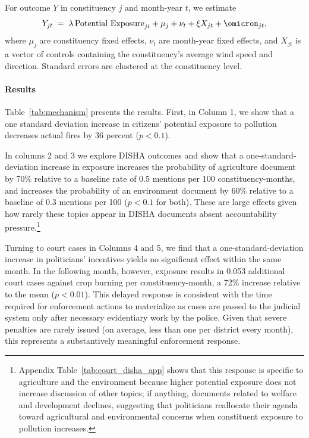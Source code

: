 \documentclass[12pt]{article}
\begin{document}
For outcome $Y$ in constituency $j$ and month-year $t$, we estimate
\begin{equation}
Y_{jt} \;=\; \lambda \, \text{Potential Exposure}_{jt} + \mu_j + \nu_t + \xi X_{jt} + \omicron_{jt},
\label{eq:mech}
\end{equation}
where $\mu_j$ are constituency fixed effects, $\nu_t$ are month-year fixed effects, and $X_{jt}$ is a vector of controls containing the constituency's average wind speed and direction. Standard errors are clustered at the constituency level.



\paragraph{Results}

Table~\ref{tab:mechanism} presents the results. First, in Column 1, we show that a one standard deviation increase in citizens' potential exposure to pollution decreases actual fires by 36 percent ($p<0.1$). 

In columns 2 and 3 we explore DISHA outcomes and show that a one-standard-deviation increase in exposure increases the probability of agriculture document by 70\% relative to a baseline rate of 0.5 mentions per 100 constituency-months, and increases the probability of an environment document by 60\% relative to a baseline of 0.3 mentions per 100 ($p<0.1$ for both). These are large effects given how rarely these topics appear in DISHA documents absent accountability pressure.\footnote{Appendix Table~\ref{tab:court_disha_app} shows that this response is specific to agriculture and the environment because higher potential exposure does not increase discussion of other topics; if anything, documents related to welfare and development declines, suggesting that politicians reallocate their agenda toward agricultural and environmental concerns when constituent exposure to pollution increases.}

Turning to court cases in Columns 4 and 5, we find that a one-standard-deviation increase in politicians' incentives yields no significant effect within the same month. In the following month, however, exposure results in 0.053 additional court cases against crop burning per constituency-month, a 72\% increase relative to the mean ($p<0.01$). This delayed response is consistent with the time required for enforcement actions to materialize as cases are passed to the judicial system only after necessary evidentiary work by the police. Given that severe penalties are rarely issued (on average, less than one per district every month), this represents a substantively meaningful enforcement response.
\end{document}
